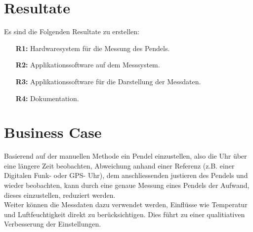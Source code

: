 \section{Resultate}
Es sind die Folgenden Resultate zu erstellen:
\begin{itemize}
	\item[\textbf{R1:}] Hardwaresystem für die Messung des Pendels.
	\item[\textbf{R2:}] Applikationssoftware auf dem Messsystem.
	\item[\textbf{R3:}] Applikationssoftware für die Darstellung der Messdaten.
	\item[\textbf{R4:}] Dokumentation.
\end{itemize}

\section{Business Case}%
	Basierend auf der manuellen Methode ein Pendel einzustellen, also die Uhr über eine längere Zeit beobachten, Abweichung anhand einer Referenz (z.B. einer Digitalen Funk- oder GPS- Uhr), dem anschliessenden justieren des Pendels und wieder beobachten, kann durch eine genaue Messung eines Pendels der Aufwand, dieses einzustellen, reduziert werden.\\
	 Weiter können die Messdaten dazu verwendet werden, Einflüsse wie Temperatur und Luftfeuchtigkeit direkt zu berücksichtigen. Dies führt zu einer qualitiativen Verbesserung der Einstellungen.